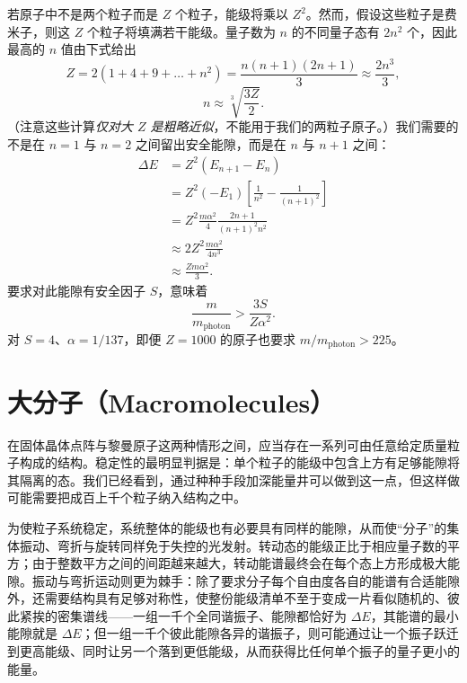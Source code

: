 若原子中不是两个粒子而是 $Z$ 个粒子，能级将乘以 $Z^{2}$。然而，假设这些粒子是费米子，则这 $Z$ 个粒子将填满若干能级。量子数为 $n$ 的不同量子态有 $2n^{2}$ 个，因此最高的 $n$ 值由下式给出
\begin{equation}
Z=2(1+4+9+\dots+n^{2})=\frac{n(n+1)(2n+1)}{3}\approx\frac{2n^{3}}{3},
\end{equation}
\begin{equation}
n\approx\sqrt[3]{\frac{3Z}{2}}.
\end{equation}
（注意这些计算\emph{仅对大 $Z$ 是粗略近似}，不能用于我们的两粒子原子。）我们需要的不是在 $n=1$ 与 $n=2$ 之间留出安全能隙，而是在 $n$ 与 $n+1$ 之间：
\begin{align}
\Delta E&=Z^{2}(E_{n+1}-E_{n})\nonumber\\
&=Z^{2}(-E_{1})\left[\frac{1}{n^{2}}-\frac{1}{(n+1)^{2}}\right]\nonumber\\
&=Z^{2}\frac{m\alpha^{2}}{4}\frac{2n+1}{(n+1)^{2}n^{2}}\nonumber\\
&\approx 2Z^{2}\frac{m\alpha^{2}}{4n^{3}}\nonumber\\
&\approx \frac{Zm\alpha^{2}}{3}.
\end{align}
要求对此能隙有安全因子 $S$，意味着
\begin{equation}
\frac{m}{m_{\mathrm{photon}}}>\frac{3S}{Z\alpha^{2}}.\tag{3}
\end{equation}
对 $S=4$、$\alpha=1/137$，即便 $Z=1000$ 的原子也要求 $m/m_{\mathrm{photon}}>225$。

\section{大分子（Macromolecules）}

在固体晶体点阵与黎曼原子这两种情形之间，应当存在一系列可由任意给定质量粒子构成的结构。稳定性的最明显判据是：单个粒子的能级中包含上方有足够能隙将其隔离的态。我们已经看到，通过种种手段加深能量井可以做到这一点，但这样做可能需要把成百上千个粒子纳入结构之中。

为使粒子系统稳定，系统整体的能级也有必要具有同样的能隙，从而使“分子”的集体振动、弯折与旋转同样免于失控的光发射。转动态的能级正比于相应量子数的平方；由于整数平方之间的间距越来越大，转动能谱最终会在每个态上方形成极大能隙。振动与弯折运动则更为棘手：除了要求分子每个自由度各自的能谱有合适能隙外，还需要结构具有足够对称性，使整份能级清单不至于变成一片看似随机的、彼此紧挨的密集谱线——一组一千个全同谐振子、能隙都恰好为 $\Delta E$，其能谱的最小能隙就是 $\Delta E$；但一组一千个彼此能隙各异的谐振子，则可能通过让一个振子跃迁到更高能级、同时让另一个落到更低能级，从而获得比任何单个振子的量子更小的能量。

